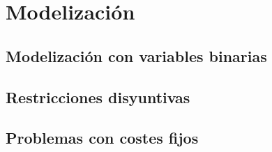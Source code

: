 \chapter{Modelización}
\label{mod}
\section{Modelización con variables binarias}
\section{Restricciones disyuntivas}
\section{Problemas con costes fijos}
